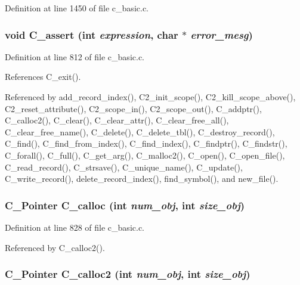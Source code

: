 Definition at line 1450 of file c\_\-basic.c.
\subsubsection{\setlength{\rightskip}{0pt plus 5cm}void C\_\-assert (int {\em expression}, char $\ast$ {\em error\_\-mesg})}\label{c__basic_8c_e3a5e797764be416757a30e7cf126d66}




Definition at line 812 of file c\_\-basic.c.

References C\_\-exit().

Referenced by add\_\-record\_\-index(), C2\_\-init\_\-scope(), C2\_\-kill\_\-scope\_\-above(), C2\_\-reset\_\-attribute(), C2\_\-scope\_\-in(), C2\_\-scope\_\-out(), C\_\-addptr(), C\_\-calloc2(), C\_\-clear(), C\_\-clear\_\-attr(), C\_\-clear\_\-free\_\-all(), C\_\-clear\_\-free\_\-name(), C\_\-delete(), C\_\-delete\_\-tbl(), C\_\-destroy\_\-record(), C\_\-find(), C\_\-find\_\-from\_\-index(), C\_\-find\_\-index(), C\_\-findptr(), C\_\-findstr(), C\_\-forall(), C\_\-full(), C\_\-get\_\-arg(), C\_\-malloc2(), C\_\-open(), C\_\-open\_\-file(), C\_\-read\_\-record(), C\_\-strsave(), C\_\-unique\_\-name(), C\_\-update(), C\_\-write\_\-record(), delete\_\-record\_\-index(), find\_\-symbol(), and new\_\-file().
\subsubsection{\setlength{\rightskip}{0pt plus 5cm}\bf{C\_\-Pointer} C\_\-calloc (int {\em num\_\-obj}, int {\em size\_\-obj})}\label{c__basic_8c_fad9011d98ff56b182b52e2f68d67a82}




Definition at line 828 of file c\_\-basic.c.

Referenced by C\_\-calloc2().
\subsubsection{\setlength{\rightskip}{0pt plus 5cm}\bf{C\_\-Pointer} C\_\-calloc2 (int {\em num\_\-obj}, int {\em size\_\-obj})}\label{c__basic_8c_e0afa8cd9a3869c1e1f21acec0736f8d}




